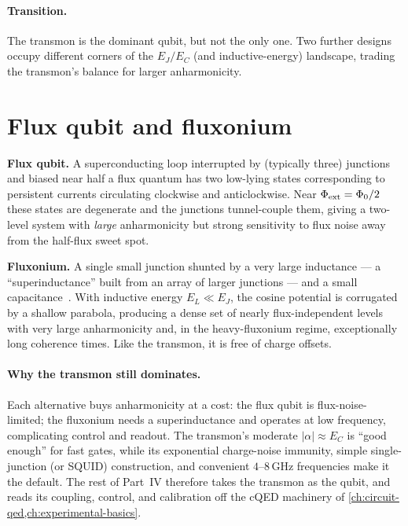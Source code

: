 \paragraph{Transition.}
The transmon is the dominant qubit, but not the only one. Two further
designs occupy different corners of the $E_J/E_C$ (and inductive-energy)
landscape, trading the transmon's balance for larger anharmonicity.

\section{Flux qubit and fluxonium}
\label{sec:flux-fluxonium}

\begin{statement}
\label{stmt:flux-fluxonium}
\textbf{Flux qubit.} A superconducting loop interrupted by (typically
three) junctions and biased near half a flux quantum has two low-lying
states corresponding to persistent currents circulating clockwise and
anticlockwise. Near $\Phi_{\rm ext}=\Phi_0/2$ these states are
degenerate and the junctions tunnel-couple them, giving a two-level
system with \emph{large} anharmonicity but strong sensitivity to flux
noise away from the half-flux sweet spot.

\textbf{Fluxonium.} A single small junction shunted by a very large
inductance --- a ``superinductance'' built from an array of larger
junctions --- and a small capacitance~\cite{manucharyan2009}. With
inductive energy $E_L\ll E_J$, the cosine potential is corrugated by a
shallow parabola, producing a dense set of nearly flux-independent
levels with very large anharmonicity and, in the heavy-fluxonium
regime, exceptionally long coherence times. Like the transmon, it is
free of charge offsets.
\end{statement}

\paragraph{Why the transmon still dominates.}
Each alternative buys anharmonicity at a cost: the flux qubit is
flux-noise-limited; the fluxonium needs a superinductance and operates
at low frequency, complicating control and readout. The transmon's
moderate $|\alpha|\approx E_C$ is ``good enough'' for fast gates, while
its exponential charge-noise immunity, simple single-junction (or
SQUID) construction, and convenient $4$--$8\,$GHz frequencies make it
the default. The rest of Part~IV therefore takes the transmon as the
qubit, and reads its coupling, control, and calibration off the cQED
machinery of \cref{ch:circuit-qed,ch:experimental-basics}.

